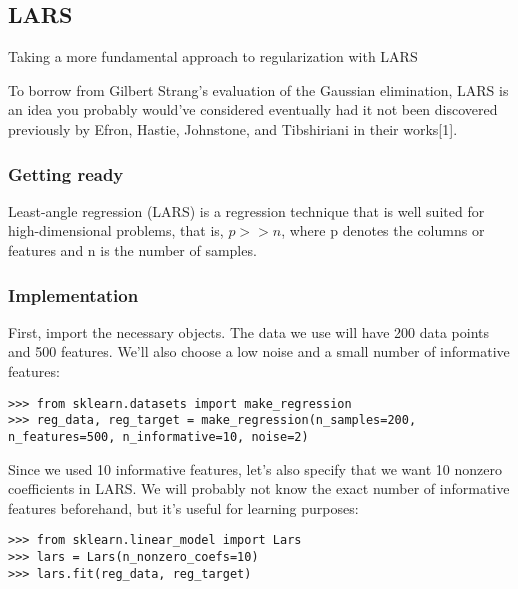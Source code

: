 \documentclass[SKL-MASTER.tex]{subfiles}
\begin{document}
\subsection{LARS}
Taking a more fundamental approach to regularization with LARS

To borrow from Gilbert Strang's evaluation of the Gaussian elimination, LARS is an idea
you probably would've considered eventually had it not been discovered previously by
Efron, Hastie, Johnstone, and Tibshiriani in their works[1].

\subsubsection{Getting ready}
Least-angle regression (LARS) is a regression technique that is well suited for high-dimensional
problems, that is, $p >> n$, where p denotes the columns or features and n is the number
of samples.
\subsubsection{Implementation}
First, import the necessary objects. The data we use will have 200 data points and 500
features. We'll also choose a low noise and a small number of informative features:
\begin{framed}
	\begin{verbatim}
>>> from sklearn.datasets import make_regression
>>> reg_data, reg_target = make_regression(n_samples=200,
n_features=500, n_informative=10, noise=2)
\end{verbatim}
\end{framed}
Since we used 10 informative features, let's also specify that we want 10 nonzero coefficients
in LARS. We will probably not know the exact number of informative features beforehand, but
it's useful for learning purposes:
\begin{framed}
	\begin{verbatim}
>>> from sklearn.linear_model import Lars
>>> lars = Lars(n_nonzero_coefs=10)
>>> lars.fit(reg_data, reg_target)
\end{verbatim}
\end{framed}
\end{document}
